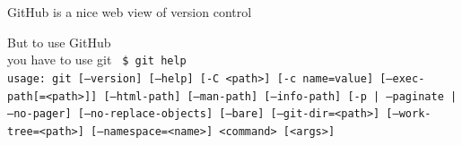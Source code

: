 \documentclass[xcolor=svgnames,17pt]{beamer}
\begin{document}
\begin{frame}
\tableofcontents[currentsection]
\end{frame}

\begin{frame}{GitHub is a nice web view of version control}
\end{frame}

\begin{frame}[fragile]{But to use GitHub \\ you have to use git}
\texttt{
\$ git help \\
usage: git [--version] [--help] [-C <path>] [-c name=value]
           [--exec-path[=<path>]] [--html-path] [--man-path] [--info-path]
           [-p | --paginate | --no-pager] [--no-replace-objects] [--bare]
           [--git-dir=<path>] [--work-tree=<path>] [--namespace=<name>]
           <command> [<args>]
}
\end{frame}
\end{document}
